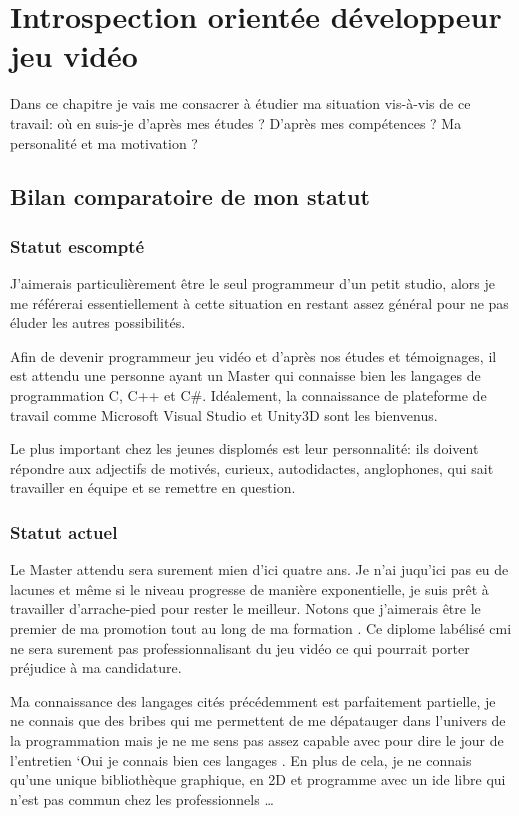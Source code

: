 \documentclass[12pt, a4paper]{report} %
\begin{document}
\chapter{Introspection orientée développeur jeu vidéo}
Dans ce chapitre je vais me consacrer à étudier ma situation vis-à-vis de ce travail: où en suis-je d'après mes études ? D'après mes compétences ? Ma personalité et ma motivation ? 
\section{Bilan comparatoire de mon statut}
\subsection{Statut escompté}
J'aimerais particulièrement être le seul programmeur d'un petit studio, alors je me référerai essentiellement à cette situation en restant assez général pour ne pas éluder les autres possibilités.

Afin de devenir programmeur jeu vidéo et d'après nos études et témoignages, il est attendu une personne ayant un Master  qui connaisse bien les langages de programmation C, C++ et C\#{}. Idéalement, la connaissance de plateforme de travail comme Microsoft Visual Studio et Unity3D sont les bienvenus. 

Le plus important chez les jeunes displomés est leur personnalité: ils doivent répondre aux adjectifs de motivés, curieux, autodidactes, anglophones, qui sait travailler en équipe et  se remettre en question.

\subsection{Statut actuel}
Le Master attendu sera surement mien d'ici quatre ans. Je n'ai juqu'ici pas eu de lacunes et même si le niveau progresse de manière exponentielle, je suis prêt à travailler d'arrache-pied pour rester le meilleur. Notons que j'aimerais être le premier de ma promotion tout au long de ma formation . Ce diplome labélisé \acrshort{cmi} ne sera surement pas professionnalisant du jeu vidéo ce qui pourrait porter préjudice à ma candidature.

Ma connaissance des langages cités précédemment est parfaitement partielle, je ne connais que des bribes qui me permettent de me dépatauger dans l'univers de la programmation mais je ne me sens pas assez capable avec pour dire le jour de l'entretien `\og Oui je connais bien ces langages \fg{}. En plus de cela, je ne connais qu'une unique bibliothèque graphique, en 2D et programme avec un \acrshort{ide} libre qui n'est pas commun chez les professionnels \dots{} 
\end{document}
